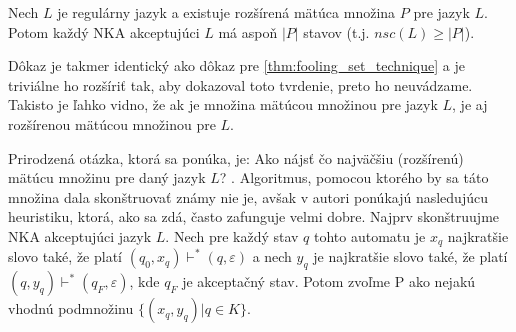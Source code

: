 \begin{theorem}
\label{thm:extended_fooling_set_technique}
Nech $ L $ je regulárny jazyk a existuje rozšírená mätúca množina $ P $ pre jazyk $ L $. Potom každý NKA akceptujúci $ L $ má aspoň $ |P| $ stavov (t.j. $ nsc(L) \geq |P| $).
\end{theorem}

Dôkaz je takmer identický ako dôkaz pre \ref{thm:fooling_set_technique} a je triviálne ho rozšíriť tak, aby dokazoval toto tvrdenie, preto ho neuvádzame. Takisto je ľahko vidno, že ak je množina mätúcou množinou pre jazyk $ L $, je aj rozšírenou mätúcou množinou pre $ L $.
\par
Prirodzená otázka, ktorá sa ponúka, je: \glqq Ako nájsť čo najväčšiu (rozšírenú) mätúcu množinu pre daný jazyk $ L $? \grqq. Algoritmus, pomocou ktorého by sa táto množina dala skonštruovať známy nie je, avšak v 
\cite{GlaisterShalit1996} autori ponúkajú nasledujúcu heuristiku, ktorá, ako sa zdá, často zafunguje velmi dobre. Najprv skonštruujme NKA akceptujúci jazyk $ L $. Nech pre každý stav $ q $ tohto automatu je $ x_q $ najkratšie slovo také, že platí $ (q_0,x_q) \vdash^{*} (q,\varepsilon) $ a nech $ y_q $ je najkratšie slovo také, že platí $ (q, y_q) \vdash^{*} (q_F,\varepsilon) $, kde $ q_F $ je akceptačný stav. Potom zvoľme P ako nejakú vhodnú podmnožinu $ \lbrace (x_q,y_q) | q \in K \rbrace $.


